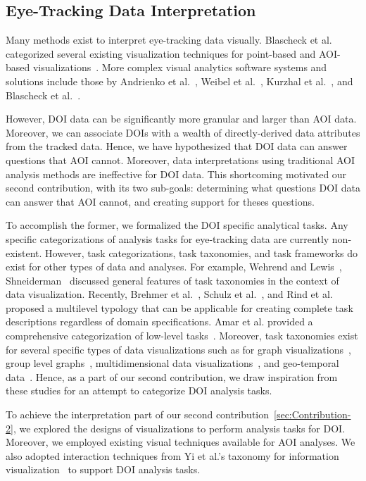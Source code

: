 \subsection{Eye-Tracking Data Interpretation}
Many methods exist to interpret eye-tracking data visually. Blascheck et al. categorized several existing visualization techniques for point-based and AOI-based visualizations~\cite{Bla14}. More complex visual analytics software systems and solutions include those by Andrienko et al.~\cite{And12}, Weibel et al.~\cite{Wei12}, Kurzhal et al.~\cite{Kur14}, and Blascheck et al.~\cite{Bla16}.

However, DOI data can be significantly more granular and larger than AOI data. Moreover, we can associate DOIs with a wealth of directly-derived data attributes from the tracked data. Hence, we have hypothesized that DOI data can answer questions that AOI cannot. Moreover, data interpretations using traditional AOI analysis methods are ineffective for DOI data. This shortcoming motivated our second contribution, with its two sub-goals: determining what questions DOI data can answer that AOI cannot, and creating support for theses questions. 
 
To accomplish the former, we formalized the DOI specific analytical tasks. Any specific categorizations of analysis tasks for eye-tracking data are currently non-existent. However, task categorizations, task taxonomies, and task frameworks do exist for other types of data and analyses. For example, Wehrend and Lewis~\cite{Weh90}, Shneiderman~\cite{Shne96} discussed general features of task taxonomies in the context of data visualization. Recently, Brehmer et al.~\cite{Bre13}, Schulz et al.~\cite{Sch13}, and Rind et al.~\cite{Rind15} proposed a multilevel typology that can be applicable for creating complete task descriptions regardless of domain specifications. Amar et al. provided a comprehensive categorization of low-level tasks~\cite{Ama05}. Moreover, task taxonomies exist for several specific types of data visualizations such as for graph visualizations~\cite{Lee06}, group level graphs~\cite{Sak14}, multidimensional data visualizations~\cite{Ward02}, and geo-temporal data~\cite{And03, Roth13}. Hence, as a part of our second contribution, we draw inspiration from these studies for an attempt to categorize DOI analysis tasks. 

To achieve the interpretation part of our second contribution~\ref{sec:Contribution-2}, we explored the designs of visualizations to perform analysis tasks for DOI. Moreover, we employed existing visual techniques available for AOI analyses. We also adopted interaction techniques from Yi et al.'s taxonomy for information visualization~\cite{Yi07} to support DOI analysis tasks.  
